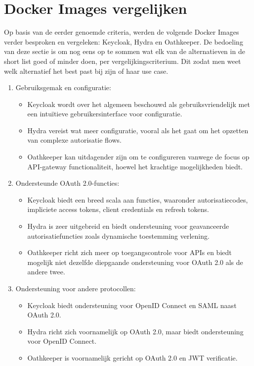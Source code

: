 \section{Docker Images vergelijken}%
\label{sec:docker-images-vergelijken}
Op basis van de eerder genoemde criteria, werden de volgende Docker Images verder besproken en vergeleken: Keycloak, Hydra en Oathkeeper.
De bedoeling van deze sectie is om nog eens op te sommen wat elk van de alternatieven in de short list goed of minder doen, per vergelijkingscriterium.
Dit zodat men weet welk alternatief het best past bij zijn of haar use case.

\begin{enumerate}
  \item Gebruiksgemak en configuratie:
  \begin{itemize}
    \item Keycloak wordt over het algemeen beschouwd als gebruiksvriendelijk met een intuïtieve gebruikersinterface voor configuratie.
    \item Hydra vereist wat meer configuratie, vooral als het gaat om het opzetten van complexe autorisatie flows.
    \item Oathkeeper kan uitdagender zijn om te configureren vanwege de focus op API-gateway functionaliteit, hoewel het krachtige mogelijkheden biedt.
  \end{itemize}
  
  \item Ondersteunde OAuth 2.0-functies:
  \begin{itemize}
    \item Keycloak biedt een breed scala aan functies, waaronder autorisatiecodes, impliciete access tokens, client credentials en refresh tokens.
    \item Hydra is zeer uitgebreid en biedt ondersteuning voor geavanceerde autorisatiefuncties zoals dynamische toestemming verlening.
    \item Oathkeeper richt zich meer op toegangscontrole voor APIs en biedt mogelijk niet dezelfde diepgaande ondersteuning voor OAuth 2.0 als de andere twee.
  \end{itemize}
  
  \item Ondersteuning voor andere protocollen:
  \begin{itemize}
    \item Keycloak biedt ondersteuning voor OpenID Connect en SAML naast OAuth 2.0.
    \item Hydra richt zich voornamelijk op OAuth 2.0, maar biedt ondersteuning voor OpenID Connect.
    \item Oathkeeper is voornamelijk gericht op OAuth 2.0 en JWT verificatie.
  \end{itemize}
  

\end{enumerate}
